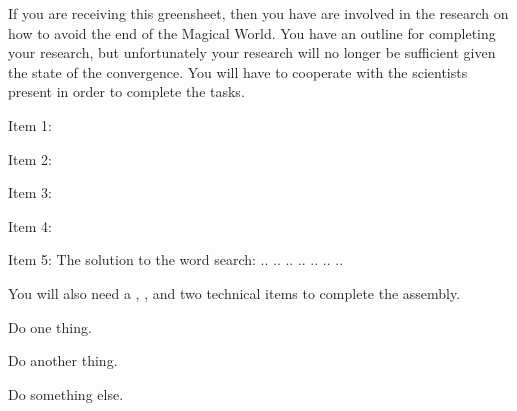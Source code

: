 \documentclass[green]{guildcamp3}
\begin{document}
\name{\gSaveTheWorldMages{}}






If you are receiving this greensheet, then you have are involved in the research on how to avoid the end of the Magical World. You have an outline for completing your research, but unfortunately your research will no longer be sufficient given the state of the convergence. You will have to cooperate with the scientists present in order to complete the tasks. 

Item 1:

Item 2:

Item 3:

Item 4:

Item 5: The solution to the word search: .. .. .. ..    .. .. ..



You will also need a \iCauldron{}, \iPlumbicRod{}, and two technical items to complete the assembly. 


\begin{enum}[Directions]
  \item Do one thing.
  \item Do another thing.
  \item Do something else.
\end{enum}
\end{document}
